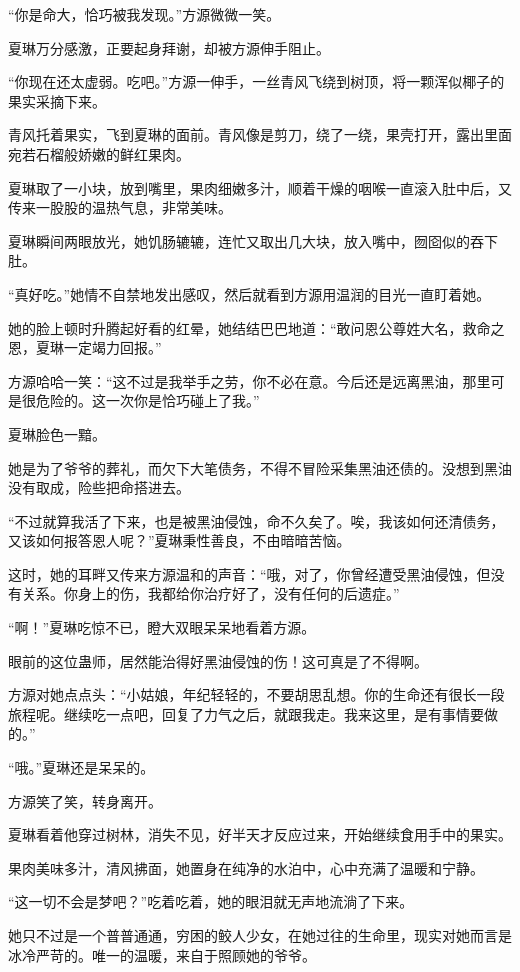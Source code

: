\begin{this_body}
“你是命大，恰巧被我发现。”方源微微一笑。

夏琳万分感激，正要起身拜谢，却被方源伸手阻止。

“你现在还太虚弱。吃吧。”方源一伸手，一丝青风飞绕到树顶，将一颗浑似椰子的果实采摘下来。

青风托着果实，飞到夏琳的面前。青风像是剪刀，绕了一绕，果壳打开，露出里面宛若石榴般娇嫩的鲜红果肉。

夏琳取了一小块，放到嘴里，果肉细嫩多汁，顺着干燥的咽喉一直滚入肚中后，又传来一股股的温热气息，非常美味。

夏琳瞬间两眼放光，她饥肠辘辘，连忙又取出几大块，放入嘴中，囫囵似的吞下肚。

“真好吃。”她情不自禁地发出感叹，然后就看到方源用温润的目光一直盯着她。

她的脸上顿时升腾起好看的红晕，她结结巴巴地道：“敢问恩公尊姓大名，救命之恩，夏琳一定竭力回报。”

方源哈哈一笑：“这不过是我举手之劳，你不必在意。今后还是远离黑油，那里可是很危险的。这一次你是恰巧碰上了我。”

夏琳脸色一黯。

她是为了爷爷的葬礼，而欠下大笔债务，不得不冒险采集黑油还债的。没想到黑油没有取成，险些把命搭进去。

“不过就算我活了下来，也是被黑油侵蚀，命不久矣了。唉，我该如何还清债务，又该如何报答恩人呢？”夏琳秉性善良，不由暗暗苦恼。

这时，她的耳畔又传来方源温和的声音：“哦，对了，你曾经遭受黑油侵蚀，但没有关系。你身上的伤，我都给你治疗好了，没有任何的后遗症。”

“啊！”夏琳吃惊不已，瞪大双眼呆呆地看着方源。

眼前的这位蛊师，居然能治得好黑油侵蚀的伤！这可真是了不得啊。

方源对她点点头：“小姑娘，年纪轻轻的，不要胡思乱想。你的生命还有很长一段旅程呢。继续吃一点吧，回复了力气之后，就跟我走。我来这里，是有事情要做的。”

“哦。”夏琳还是呆呆的。

方源笑了笑，转身离开。

夏琳看着他穿过树林，消失不见，好半天才反应过来，开始继续食用手中的果实。

果肉美味多汁，清风拂面，她置身在纯净的水泊中，心中充满了温暖和宁静。

“这一切不会是梦吧？”吃着吃着，她的眼泪就无声地流淌了下来。

她只不过是一个普普通通，穷困的鲛人少女，在她过往的生命里，现实对她而言是冰冷严苛的。唯一的温暖，来自于照顾她的爷爷。


\end{this_body}
